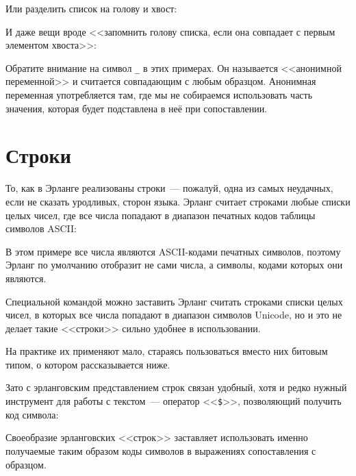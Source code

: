 \documentclass[
  paper=a4,
  fontsize=14pt,
  openany,
  appendixprefix=true
]{scrbook}
\begin{document}
Или разделить список на голову и хвост:

И даже вещи вроде <<запомнить голову списка, если она совпадает с первым элементом хвоста>>:

\label{anonymous}
Обратите внимание на символ \lstinline{_} в этих примерах. Он называется <<анонимной переменной>> и считается совпадающим с любым образцом. Анонимная переменная употребляется там, где мы не собираемся использовать часть значения, которая будет подставлена в неё при сопоставлении.

\section{Строки}
\label{strings}

То, как в Эрланге реализованы строки~--- пожалуй, одна из самых неудачных, если не сказать уродливых, сторон языка. Эрланг считает строками любые списки целых чисел, где все числа попадают в диапазон печатных кодов таблицы символов ASCII:

В этом примере все числа являются ASCII-кодами печатных символов, поэтому Эрланг по умолчанию отобразит не сами числа, а символы, кодами которых они являются.

Специальной командой можно заставить Эрланг считать строками списки целых чисел, в которых все числа попадают в диапазон символов Unicode, но и это не делает такие <<строки>> сильно удобнее в использовании.

На практике их применяют мало, стараясь пользоваться вместо них битовым типом, о котором рассказывается ниже.

Зато с эрланговским представлением строк связан удобный, хотя и редко нужный инструмент для работы с текстом~--- оператор <<\lstinline{$}>>, %
позволяющий получить код символа:

Своеобразие эрланговских <<строк>> заставляет использовать именно получаемые таким образом коды символов в выражениях сопоставления с образцом.
\end{document}
